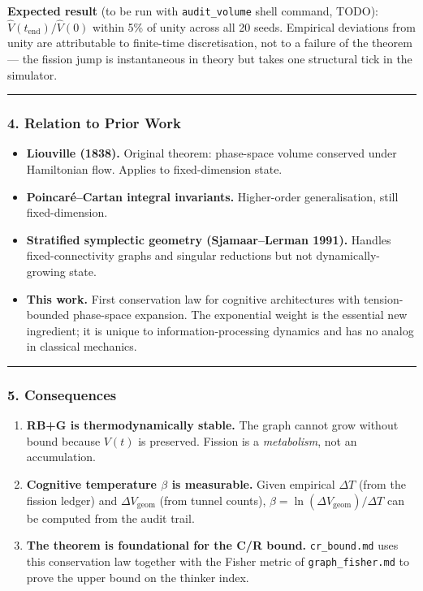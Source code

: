 \documentclass[
  11pt,
  a4paper,
]{article}
\providecommand{\tightlist}{%
  \setlength{\itemsep}{0pt}\setlength{\parskip}{0pt}}
\begin{document}
\textbf{Expected result} (to be run with \texttt{audit\_volume} shell
command, TODO): \(\hat{V}(t_\text{end}) / \hat{V}(0)\) within 5\% of
unity across all 20 seeds. Empirical deviations from unity are
attributable to finite-time discretisation, not to a failure of the
theorem --- the fission jump is instantaneous in theory but takes one
structural tick in the simulator.

\begin{center}\rule{0.5\linewidth}{0.5pt}\end{center}

\subsubsection{4. Relation to Prior Work}\label{relation-to-prior-work}

\begin{itemize}
\tightlist
\item
  \textbf{Liouville (1838).} Original theorem: phase-space volume
  conserved under Hamiltonian flow. Applies to fixed-dimension state.
\item
  \textbf{Poincaré--Cartan integral invariants.} Higher-order
  generalisation, still fixed-dimension.
\item
  \textbf{Stratified symplectic geometry (Sjamaar--Lerman 1991).}
  Handles fixed-connectivity graphs and singular reductions but not
  dynamically-growing state.
\item
  \textbf{This work.} First conservation law for cognitive architectures
  with tension-bounded phase-space expansion. The exponential weight is
  the essential new ingredient; it is unique to information-processing
  dynamics and has no analog in classical mechanics.
\end{itemize}

\begin{center}\rule{0.5\linewidth}{0.5pt}\end{center}

\subsubsection{5. Consequences}\label{consequences-1}

\begin{enumerate}
\def\labelenumi{\arabic{enumi}.}
\tightlist
\item
  \textbf{RB+G is thermodynamically stable.} The graph cannot grow
  without bound because \(V(t)\) is preserved. Fission is a
  \emph{metabolism}, not an accumulation.
\item
  \textbf{Cognitive temperature \(\beta\) is measurable.} Given
  empirical \(\Delta T\) (from the fission ledger) and
  \(\Delta V_\text{geom}\) (from tunnel counts),
  \(\beta = \ln(\Delta V_\text{geom}) / \Delta T\) can be computed from
  the audit trail.
\item
  \textbf{The theorem is foundational for the C/R bound.}
  \texttt{cr\_bound.md} uses this conservation law together with the
  Fisher metric of \texttt{graph\_fisher.md} to prove the upper bound on
  the thinker index.
\end{enumerate}
\end{document}
